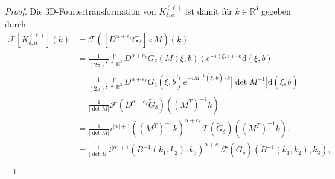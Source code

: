 \documentclass[12pt,a4paper]{scrartcl}
\newcommand{\dd}{\mathrm{d}}
\numberwithin{equation}{section}
\newcommand{\R}{\mathbb{R}} %
\newcommand{\F}{\mathcal{F}} %
\begin{document}
\begin{proof}
Die 3D-Fouriertransformation von $K_{\delta,\alpha}^{(\ell)}$ ist damit für $k \in \R^3$ gegeben durch
\begin{align*}
\F [K_{\delta,\alpha}^{(\ell)}](k) 
&= \F \left([D^{\alpha + e_\ell} \widetilde{G}_\delta]  \circ M \right)(k) \\
&= \frac{1}{(2 \pi)^{\frac{3}{2}}}\int_{\R^3} D^{\alpha + e_\ell} \widetilde G_\delta (M(\xi,b)) e^{-i(\xi,b)\cdot k} \dd(\xi,b) \\
&= \frac{1}{(2 \pi)^{\frac{3}{2}}}\int_{\R^3} D^{\alpha + e_\ell} \widetilde G_\delta (\tilde \xi, \tilde b) e^{-i M^{-1}(\tilde \xi,\tilde b)\cdot k} |\det M^{-1}| \dd(\tilde \xi,\tilde b) \\
&= \frac{1}{|\det M|} \F \left(D^{\alpha + e_\ell} \widetilde{G}_\delta\right)((M^T)^{-1} k) \\
&=\frac{1}{|\det M|} i^{|\alpha|+1} ((M^T)^{-1} k)^{\alpha + e_\ell} \F \left(\widetilde{G}_\delta\right)((M^T)^{-1} k). \\
&=\frac{1}{|\det B|} i^{|\alpha|+1} (B^{-1}(k_1,k_2),k_3)^{\alpha + e_\ell} \F \left(\widetilde{G}_\delta\right)(B^{-1}(k_1,k_2),k_3), \\
\end{align*}


\end{proof}
\end{document}
